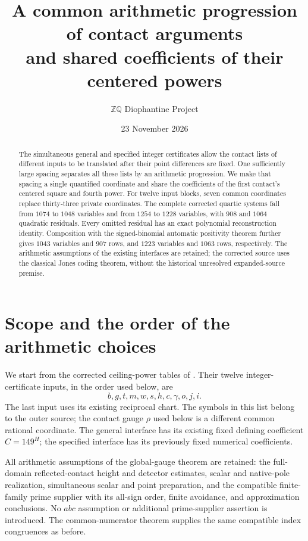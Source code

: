 \documentclass[11pt]{article}
\title{A common arithmetic progression of contact arguments\\
and shared coefficients of their centered powers}
\author{\(\mathbb Z\mathbb Q\) Diophantine Project}
\date{23 November 2026}
\begin{document}
\maketitle
\begin{abstract}
The simultaneous general and specified integer certificates allow the
contact lists of different inputs to be translated after their point
differences are fixed. One sufficiently large spacing separates all
these lists by an arithmetic progression. We make that spacing a single
quantified coordinate and share the coefficients of the first contact's
centered square and fourth power. For twelve input blocks, seven common
coordinates replace thirty-three private coordinates. The complete
corrected quartic systems fall from $1074$ to $1048$ variables and from
$1254$ to $1228$ variables, with $908$ and $1064$ quadratic residuals.
Every omitted residual has an exact polynomial reconstruction identity.
Composition with the signed-binomial automatic positivity theorem
further gives $1043$ variables and $907$ rows, and $1223$ variables
and $1063$ rows, respectively.
The arithmetic assumptions of the existing interfaces are retained;
the corrected source uses the classical Jones coding theorem, without
the historical unresolved expanded-source premise.
\end{abstract}

\section{Scope and the order of the arithmetic choices}

We start from the corrected ceiling-power tables of
\cite{corrected,ceiling}. Their twelve integer-certificate inputs, in
the order used below, are
\[
 b,g,t,m,w,s,h,c,\gamma,o,j,i.
\]
The last input uses its existing reciprocal chart. The symbols in this
list belong to the outer source; the contact gauge $\rho$ used below is
a different common rational coordinate. The general interface has its
existing fixed defining coefficient $C=149^H$; the specified interface
has its previously fixed numerical coefficients.

All arithmetic assumptions of the global-gauge theorem \cite{global}
are retained: the full-domain reflected-contact height and detector
estimates, scalar and native-pole realization, simultaneous scalar and
point preparation, and the compatible finite-family prime supplier with
its all-sign order, finite avoidance, and approximation conclusions.
No $abc$ assumption or additional prime-supplier assertion is introduced.
The common-numerator theorem \cite{common} supplies the same compatible
index congruences as before.
\end{document}

